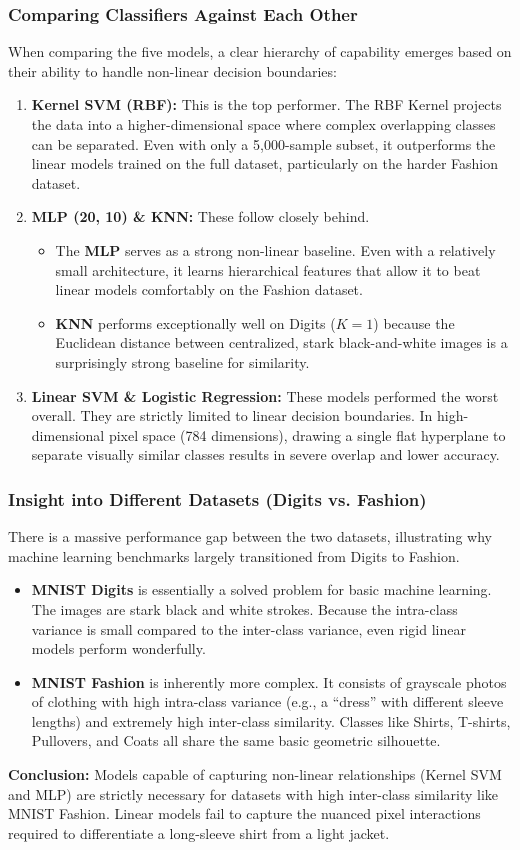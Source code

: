 \documentclass[twoside, 10pt]{article}
\begin{document}
\subsubsection{Comparing Classifiers Against Each Other}
When comparing the five models, a clear hierarchy of capability emerges based on their ability to handle non-linear decision boundaries:
\begin{enumerate}
    \item \textbf{Kernel SVM (RBF):} This is the top performer. The RBF Kernel projects the data into a higher-dimensional space where complex overlapping classes can be separated. Even with only a 5,000-sample subset, it outperforms the linear models trained on the full dataset, particularly on the harder Fashion dataset.
    \item \textbf{MLP (20, 10) \& KNN:} These follow closely behind.
    \begin{itemize}
        \item The \textbf{MLP} serves as a strong non-linear baseline. Even with a relatively small architecture, it learns hierarchical features that allow it to beat linear models comfortably on the Fashion dataset.
        \item \textbf{KNN} performs exceptionally well on Digits ($K=1$) because the Euclidean distance between centralized, stark black-and-white images is a surprisingly strong baseline for similarity.
    \end{itemize}
    \item \textbf{Linear SVM \& Logistic Regression:} These models performed the worst overall. They are strictly limited to linear decision boundaries. In high-dimensional pixel space (784 dimensions), drawing a single flat hyperplane to separate visually similar classes results in severe overlap and lower accuracy.
\end{enumerate}
\subsubsection{Insight into Different Datasets (Digits vs. Fashion)}
There is a massive performance gap between the two datasets, illustrating why machine learning benchmarks largely transitioned from Digits to Fashion.
\begin{itemize}
    \item \textbf{MNIST Digits} is essentially a solved problem for basic machine learning. The images are stark black and white strokes. Because the intra-class variance is small compared to the inter-class variance, even rigid linear models perform wonderfully.
    \item \textbf{MNIST Fashion} is inherently more complex. It consists of grayscale photos of clothing with high intra-class variance (e.g., a ``dress'' with different sleeve lengths) and extremely high inter-class similarity. Classes like Shirts, T-shirts, Pullovers, and Coats all share the same basic geometric silhouette.
\end{itemize}
\textbf{Conclusion:} Models capable of capturing non-linear relationships (Kernel SVM and MLP) are strictly necessary for datasets with high inter-class similarity like MNIST Fashion. Linear models fail to capture the nuanced pixel interactions required to differentiate a long-sleeve shirt from a light jacket.
\end{document}
